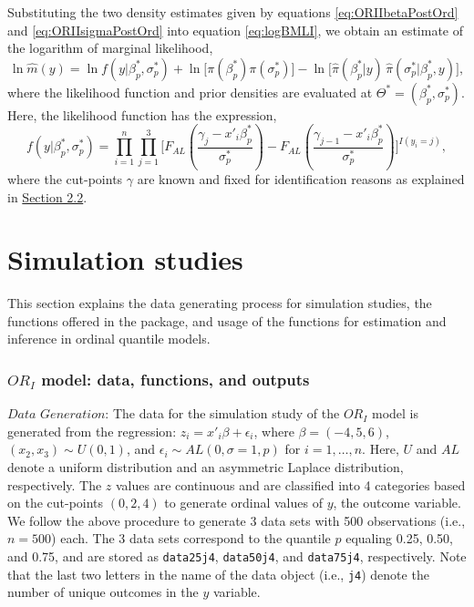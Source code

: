 Substituting the two density estimates given by equations \eqref{eq:ORIIbetaPostOrd} and \eqref{eq:ORIIsigmaPostOrd} into equation \eqref{eq:logBMLI}, we obtain an estimate of the logarithm of marginal likelihood,
\begin{equation} 
\ln \hat{m}(y) = \ln f(y|\beta_{p}^{\ast},\sigma_{p}^{\ast}) + \ln \Big[ \pi(\beta_{p}^{\ast}) \pi(\sigma_{p}^{\ast}) \Big] - \ln \Big[ \hat{\pi}(\beta_{p}^{\ast}|y) \,
\hat{\pi}(\sigma_{p}^{\ast}|\beta_{p}^{\ast},y) \Big],
\label{eq:ORIIMLestimate}
\end{equation}
where the likelihood function and prior densities are evaluated at \(\Theta^{\ast} = (\beta_{p}^{\ast}, \sigma_{p}^{\ast})\). Here, the likelihood function has the expression,
\begin{equation*} 
f(y|\beta_{p}^{\ast},\sigma_{p}^{\ast}) =  \prod_{i=1}^{n}  \prod_{j=1}^{3} \bigg[F_{AL}\left(\frac{\gamma_{j} - x'_{i}\beta_{p}^{\ast}}{\sigma_{p}^{\ast}}\right) - F_{AL}\left(\frac{\gamma_{j-1} - x'_{i}\beta_{p}^{\ast}}{\sigma_{p}^{\ast}}\right) \bigg]^{ I(y_{i} = j)},
\end{equation*}
where the cut-points \(\gamma\) are known and fixed for identification reasons as explained in \protect\hyperlink{sec:ORII}{Section 2.2}.

\hypertarget{sec:SimStudies}{%
\section{Simulation studies}\label{sec:SimStudies}}

This section explains the data generating process for simulation studies, the functions offered in the  package, and usage of the functions for estimation and inference in ordinal quantile models.

\hypertarget{subsec:SimDataORI}{%
\subsubsection{\texorpdfstring{\(OR_{I}\) model: data, functions, and outputs}{OR\_\{I\} model: data, functions, and outputs}}\label{subsec:SimDataORI}}

\(\textit{Data Generation}\): The data for the simulation study of the \(OR_{I}\) model is generated from the regression: \(z_{i} = x'_{i}\beta + \epsilon_{i}\), where \(\beta = (-4, 5, 6)\), \((x_{2},x_{3}) \sim U(0, 1)\), and \(\epsilon_{i} \sim AL(0, \sigma = 1, p)\) for \(i=1,\ldots,n\). Here, \(U\) and \(AL\) denote a uniform distribution and an asymmetric Laplace distribution, respectively. The \(z\) values are continuous and are classified into 4 categories based on the cut-points \((0, 2, 4)\) to generate ordinal values of \(y\), the outcome variable. We follow the above procedure to generate 3 data sets with 500 observations (i.e., \(n = 500\)) each. The 3 data sets correspond to the quantile \(p\) equaling 0.25, 0.50, and 0.75, and are stored as \texttt{data25j4}, \texttt{data50j4}, and \texttt{data75j4}, respectively. Note that the last two letters in the name of the data object (i.e., \texttt{j4}) denote the number of unique outcomes in the \(y\) variable.

